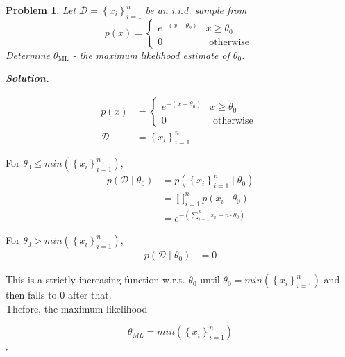 \documentclass[11pt]{amsart}
\newtheorem{problem}{Problem}
\newenvironment{solution}[1][\it{Solution}]{\textbf{#1. } }{$\square$}
\theoremstyle{definition}
\begin{document}
\begin{problem}
Let $\mathcal{D}=\left\{x_{i}\right\}_{i=1}^{n}$ be an i.i.d. sample from
$$
p(x)=\left\{\begin{array}{ll}
e^{-\left(x-\theta_{0}\right)} & x \geq \theta_{0} \\
0 & \text { otherwise }
\end{array}\right.
$$
Determine $\theta_{\mathrm{ML}}$ - the maximum likelihood estimate of $\theta_{0}$.
\end{problem}
\begin{solution}

\begin{align*}
p(x)&=\left\{\begin{array}{ll}
e^{-\left(x-\theta_{0}\right)} & x \geq \theta_{0} \\
0 & \text { otherwise }
\end{array}\right.\\
\mathcal{D}&=\left\{x_{i}\right\}_{i=1}^{n}
\end{align*}

For $\theta_0 \le min\left(\left\{x_i\right\}_{i=1}^{n}\right)$, 
\begin{align*}
p\left(\mathcal{D} \mid \theta_0 \right) &= p\left(\left\{x_{i}\right\}_{i=1}^{n} \mid \theta_0\right)\\
&= \prod_{i=1}^{n}p\left(x_i \mid \theta_0\right)\\
&= e^{-\left(\sum_{i=1}^{n}x_i-n \cdot \theta_0\right)}
\end{align*}

For $\theta_0 > min\left(\left\{x_i\right\}_{i=1}^{n}\right)$, 
\begin{align*}
p\left(\mathcal{D} \mid \theta_0 \right) &= 0
\end{align*}

This is a strictly increasing function w.r.t.  $\theta_0$ until $\theta_0 = min\left(\left\{x_i\right\}_{i=1}^{n}\right)$ and then falls to $0$ after that.\\

Thefore, the maximum likelihood

$$\theta_{ML} = min\left(\left\{x_i\right\}_{i=1}^{n}\right)$$

\end{solution}
\end{document}
